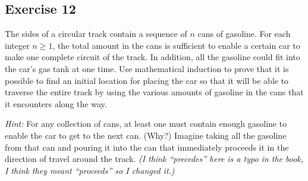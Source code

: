 \documentclass[14pt]{extarticle}
\begin{document}
\subsection{Exercise 12}
The sides of a circular track contain a sequence of $n$ cans of gasoline. For each integer $n \geq 1$, the total amount in the cans is sufficient to enable a certain car to make one complete circuit of the track. 
In addition, all the gasoline could fit into the car’s gas tank at one time. 
Use mathematical induction to prove that it is possible to find an initial location for placing the car so that it will be able to traverse the entire track by using the various amounts of gasoline in the cans that it encounters along the way.

{\it Hint:} For any collection of cans, at least one must
contain enough gasoline to enable the car to get to the
next can. (Why?) 
Imagine taking all the gasoline from that can and pouring it into the can that immediately proceeds it in the direction of travel around the track. 
{\it (I think ``precedes'' here is a typo in the book, I think they meant ``proceeds'' so I changed it.)}
\end{document}
